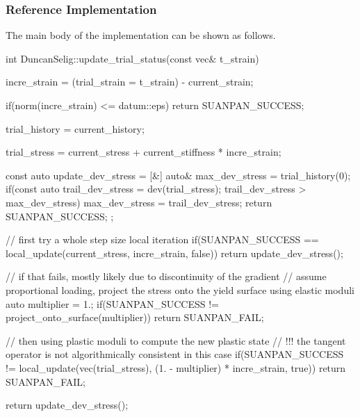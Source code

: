 \subsubsection{Reference Implementation}
The main body of the implementation can be shown as follows.
\begin{cppcode}
int DuncanSelig::update_trial_status(const vec& t_strain) {
    incre_strain = (trial_strain = t_strain) - current_strain;

    if(norm(incre_strain) <= datum::eps) return SUANPAN_SUCCESS;

    trial_history = current_history;

    trial_stress = current_stress + current_stiffness * incre_strain;

    const auto update_dev_stress = [&] {
        auto& max_dev_stress = trial_history(0);
        if(const auto trail_dev_stress = dev(trial_stress); trail_dev_stress > max_dev_stress) max_dev_stress = trail_dev_stress;
        return SUANPAN_SUCCESS;
    };

    // first try a whole step size local iteration
    if(SUANPAN_SUCCESS == local_update(current_stress, incre_strain, false)) return update_dev_stress();

    // if that fails, mostly likely due to discontinuity of the gradient
    // assume proportional loading, project the stress onto the yield surface using elastic moduli
    auto multiplier = 1.;
    if(SUANPAN_SUCCESS != project_onto_surface(multiplier)) return SUANPAN_FAIL;

    // then using plastic moduli to compute the new plastic state
    // !!! the tangent operator is not algorithmically consistent in this case
    if(SUANPAN_SUCCESS != local_update(vec(trial_stress), (1. - multiplier) * incre_strain, true)) return SUANPAN_FAIL;

    return update_dev_stress();
}
\end{cppcode}

